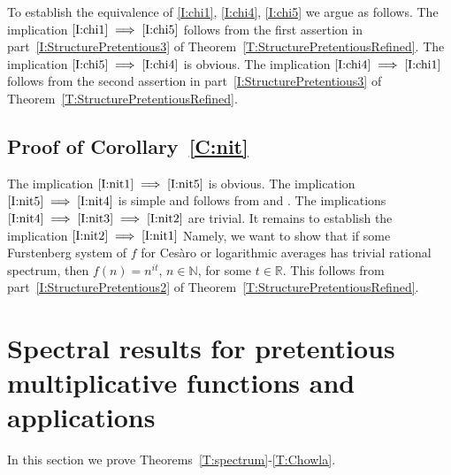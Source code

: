\documentclass[11pt]{amsart}
\theoremstyle{definition}
\newcommand{\N}{{\mathbb N}}
\newcommand{\R}{{\mathbb R}}
\begin{document}
To establish the equivalence of \eqref{I:chi1}, \eqref{I:chi4}, \eqref{I:chi5} we argue as follows.
The implication $\eqref{I:chi1}\implies  \eqref{I:chi5}$ follows from the first assertion in part~\eqref{I:StructurePretentious3} of Theorem~\ref{T:StructurePretentiousRefined}.
The implication $\eqref{I:chi5}\implies  \eqref{I:chi4}$ is obvious.
The implication $\eqref{I:chi4}\implies  \eqref{I:chi1}$ follows from the second assertion in part~\eqref{I:StructurePretentious3} of Theorem~\ref{T:StructurePretentiousRefined}.




	


 \subsection{Proof of Corollary~\ref{C:nit}}\label{SS:nit}
The implication $\eqref{I:nit1}\implies\eqref{I:nit5}$ is obvious.
The implication $\eqref{I:nit5}\implies\eqref{I:nit4}$ is simple and follows from \cite[Corollary~5.5]{GLR21} and  \cite[Section~1.3]{FH21}. The implications  $\eqref{I:nit4}\implies\eqref{I:nit3}\implies \eqref{I:nit2}$ are trivial.  It remains to establish the implication
 $\eqref{I:nit2}\implies\eqref{I:nit1}$ Namely, we want to show that  if some Furstenberg system of $f$ for Ces\`aro or logarithmic averages has trivial rational spectrum, then $f(n)=n^{it}$, $n\in \N$, for some $t\in \R$. This follows  from part~\eqref{I:StructurePretentious2} of Theorem~\ref{T:StructurePretentiousRefined}.




\section{Spectral results for pretentious multiplicative functions  and applications}
In this section we prove  Theorems~\ref{T:spectrum}-\ref{T:Chowla}.
\end{document}
